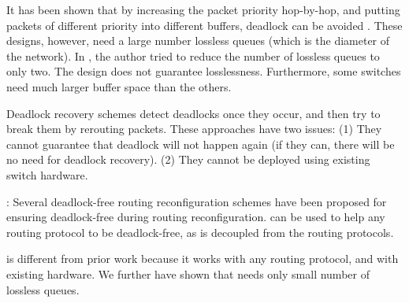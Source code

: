 
 It has been shown that by
increasing the packet priority hop-by-hop, and putting packets of different
priority into different buffers, deadlock can be avoided
\cite{firstpaper,survey,datanetworks,karol2003prevention}. These designs,
however, need a large number lossless queues (which is the diameter of the
network). In \cite{dag}, the author tried to reduce the number of lossless
queues to only two. The design does not guarantee losslessness. Furthermore,
some switches need much larger buffer space than the others. 

 Deadlock recovery schemes
\cite{isca95,shpiner2016unlocking,venkatramani1996,martinez1997,Lopez1998}
detect deadlocks once they occur, and then try to break them by rerouting
packets.  These approaches have two issues: (1) They cannot guarantee that
deadlock will not happen again (if they can, there will be no need for deadlock
recovery). (2) They cannot be deployed using existing switch hardware.



:
Several deadlock-free routing reconfiguration schemes
\cite{automatic,lysne2005,doublescheme,gara2005} have been proposed for
ensuring deadlock-free during routing reconfiguration. \sysname{} can
be used to help any routing protocol to be deadlock-free, as
\sysname{} is decoupled from the routing protocols.


 \sysname{} is different from prior work because it works with
any routing protocol, and with existing hardware. We further have shown that
\sysname{} needs only small number of lossless queues.

